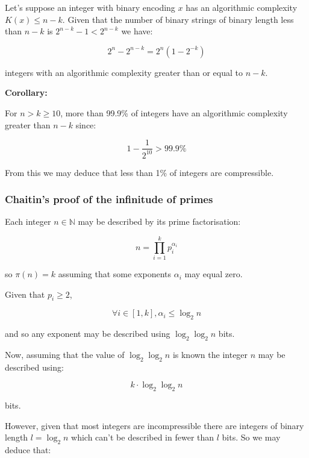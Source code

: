 \documentclass{article}
\begin{document}
Let's suppose an integer with binary encoding $x$ has an algorithmic complexity $K(x) \leq n-k$.
Given that the number of binary strings of binary length less than $n-k$ is $2^{n-k} - 1 < 2^{n-k}$ we have:

\begin{equation}
2^n - 2^{n-k} = 2^n(1-2^{-k})
\end{equation}

integers with an algorithmic complexity greater than or equal to $n-k$.

\textbf{Corollary:}

For $n > k \geq 10$, more than 99.9\% of integers have an algorithmic complexity greater than $n-k$
since:

\begin{equation}
1-\frac{1}{2^{10}} > 99.9\%
\end{equation}

From this we may deduce that less than 1\% of integers are compressible.

\subsubsection{Chaitin's proof of the infinitude of primes}

Each integer $n \in \mathbb{N}$ may be described by its prime factorisation:

\begin{equation}
n = \prod_{i=1}^k p_i^{\alpha_i}
\end{equation}

so $\pi(n)=k$ assuming that some exponents $\alpha_i$ may equal zero.

Given that $p_i \geq 2$,

\begin{equation}
\forall i \in [1,k], \alpha_i \leq \log_2 n
\end{equation}

and so any exponent may be described using $\log_2 \log_2 n$ bits.

Now, assuming that the value of $\log_2 \log_2 n$ is known the integer $n$ may be described
using:

\begin{equation}
k \cdot \log_2 \log_2 n
\end{equation}

bits.

However, given that most integers are incompressible there are integers of binary length $l = \log_2 n$ which
can't be described in fewer than $l$ bits. So we may deduce that:
\end{document}
